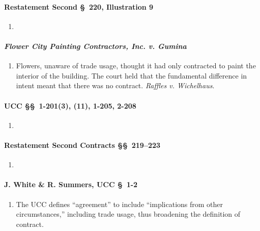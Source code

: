 \paragraph{Restatement Second \S\ 220, Illustration 9}

\begin{enumerate}
    \item %
\end{enumerate}

\paragraph{\emph{Flower City Painting Contractors, Inc. v. Gumina}}

\begin{enumerate}
    \item Flowers, unaware of trade usage, thought it had only contracted to 
    paint the interior of the building. The court held that the fundamental 
    difference in intent meant that there was no contract. \emph{Raffles v. 
    Wichelhaus}.
\end{enumerate}

\paragraph{UCC \S\S\ 1-201(3), (11), 1-205, 2-208}

\begin{enumerate}
    \item %
\end{enumerate}

\paragraph{Restatement Second Contracts \S\S\ 219--223}

\begin{enumerate}
    \item %
\end{enumerate}

\paragraph{J. White \& R. Summers, UCC \S\ 1-2}

\begin{enumerate}
    \item The UCC defines ``agreement'' to include ``implications from other 
    circumstances,'' including trade usage, thus broadening the definition of 
    contract.
\end{enumerate}

